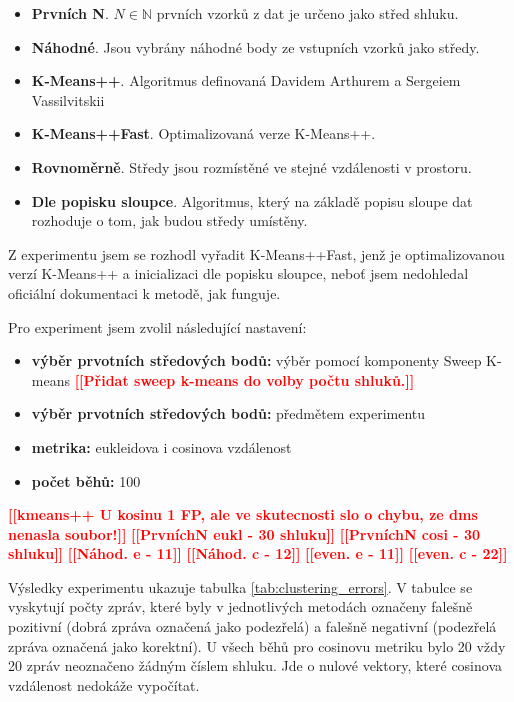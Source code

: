 \documentclass[thesis=M,czech]{FITthesis}[2012/10/20]
\newcommand{\todo}[1]{\textcolor{red}{\textbf{[[#1]]}}}
\begin{document}
			\begin{itemize} 
				\item \textbf{Prvních N}. $N \in \mathbb{N} $ prvních vzorků z dat je určeno jako střed shluku. 
				\item \textbf{Náhodné}. Jsou vybrány náhodné body ze vstupních vzorků jako středy.
				\item \textbf{K-Means++}. Algoritmus definovaná Davidem Arthurem a Sergeiem Vassilvitskii \cite{kmeans++}
				\item \textbf{K-Means++Fast}. Optimalizovaná verze K-Means++.	
				\item \textbf{Rovnoměrně}. Středy jsou rozmístěné ve stejné vzdálenosti v prostoru.		
				\item \textbf{Dle popisku sloupce}. Algoritmus, který na základě popisu sloupe dat rozhoduje o tom, jak budou středy umístěny.			
			\end{itemize}
		
		Z experimentu jsem se rozhodl vyřadit K-Means++Fast, jenž je optimalizovanou verzí K-Means++ a inicializaci dle popisku sloupce, neboť jsem nedohledal oficiální dokumentaci k metodě, jak funguje.
		
		Pro experiment jsem zvolil následující nastavení:
		\begin{itemize} 
			\item \textbf{výběr prvotních středových bodů: } výběr pomocí komponenty Sweep K-means \todo{Přidat sweep k-means do volby počtu shluků.}
			\item \textbf{výběr prvotních středových bodů: } předmětem experimentu
			\item \textbf{metrika: } eukleidova i cosinova vzdálenost
			\item \textbf{počet běhů: } 100		
		\end{itemize}
	
		\todo{kmeans++ U kosinu 1 FP, ale ve skutecnosti slo o chybu, ze dms nenasla soubor!}
		\todo{PrvníchN eukl - 30 shluku}
		\todo{PrvníchN cosi - 30 shluku}
		\todo{Náhod. e - 11}
		\todo{Náhod. c - 12}
		\todo{even. e - 11}
		\todo{even. c - 22}
		
		Výsledky experimentu ukazuje tabulka \ref{tab:clustering_errors}. V tabulce se vyskytují počty zpráv, které byly v jednotlivých metodách označeny falešně pozitivní (dobrá zpráva označená jako podezřelá) a falešně negativní (podezřelá zpráva označená jako korektní). U všech běhů pro cosinovu metriku bylo 20 vždy 20 zpráv neoznačeno žádným číslem shluku. Jde o nulové vektory, které cosinova vzdálenost nedokáže vypočítat.
		
\end{document}
